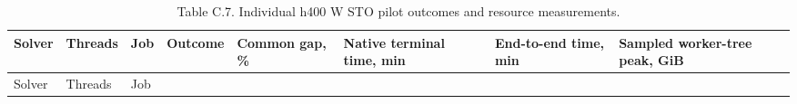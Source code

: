 \documentclass[
  english,
  11pt,
  a4paper,
]{article}
\begin{document}
\begin{longtable}[]{@{}
  >{\raggedright\arraybackslash}p{}
  >{\raggedleft\arraybackslash}p{}
  >{\raggedleft\arraybackslash}p{}
  >{\raggedright\arraybackslash}p{}
  >{\raggedleft\arraybackslash}p{}
  >{\raggedleft\arraybackslash}p{}
  >{\raggedleft\arraybackslash}p{}
  >{\raggedleft\arraybackslash}p{}@{}}
\caption{Table C.7. Individual h400 W STO pilot outcomes and resource
measurements.}\tabularnewline
\toprule\noalign{}
\begin{minipage}[b]{\linewidth}\raggedright
Solver
\end{minipage} & \begin{minipage}[b]{\linewidth}\raggedleft
Threads
\end{minipage} & \begin{minipage}[b]{\linewidth}\raggedleft
Job
\end{minipage} & \begin{minipage}[b]{\linewidth}\raggedright
Outcome
\end{minipage} & \begin{minipage}[b]{\linewidth}\raggedleft
Common gap, \%
\end{minipage} & \begin{minipage}[b]{\linewidth}\raggedleft
Native terminal time, min
\end{minipage} & \begin{minipage}[b]{\linewidth}\raggedleft
End-to-end time, min
\end{minipage} & \begin{minipage}[b]{\linewidth}\raggedleft
Sampled worker-tree peak, GiB
\end{minipage} \\
\midrule\noalign{}
\endfirsthead
\toprule\noalign{}
\begin{minipage}[b]{\linewidth}\raggedright
Solver
\end{minipage} & \begin{minipage}[b]{\linewidth}\raggedleft
Threads
\end{minipage} & \begin{minipage}[b]{\linewidth}\raggedleft
Job
\end{minipage} & \begin{minipage}[b]{\linewidth}\raggedright

\end{minipage}
\end{longtable}
\end{document}
